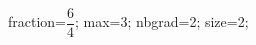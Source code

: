 \documentclass[exercice]{thedocument}%
\begin{document}
%
\>fraction=$\dfrac{6}{4}$;%
\>max=3;%
\>nbgrad=2;%
\>size=2;%
%
\end{document}
